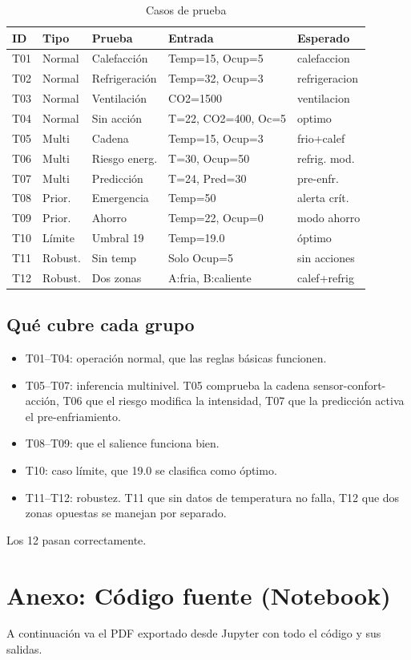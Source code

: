 \documentclass[12pt,a4paper]{article}
\begin{document}
\begin{table}[h]
\centering
\small
\begin{tabular}{lllp{3.8cm}l}
\toprule
\textbf{ID} & \textbf{Tipo} & \textbf{Prueba} & \textbf{Entrada} & \textbf{Esperado} \\
\midrule
T01 & Normal & Calefacci\'on & Temp=15, Ocup=5 & calefaccion \\
T02 & Normal & Refrigeraci\'on & Temp=32, Ocup=3 & refrigeracion \\
T03 & Normal & Ventilaci\'on & CO2=1500 & ventilacion \\
T04 & Normal & Sin acci\'on & T=22, CO2=400, Oc=5 & optimo \\
T05 & Multi & Cadena & Temp=15, Ocup=3 & frio+calef \\
T06 & Multi & Riesgo energ. & T=30, Ocup=50 & refrig. mod. \\
T07 & Multi & Predicci\'on & T=24, Pred=30 & pre-enfr. \\
T08 & Prior. & Emergencia & Temp=50 & alerta cr\'it. \\
T09 & Prior. & Ahorro & Temp=22, Ocup=0 & modo ahorro \\
T10 & L\'imite & Umbral 19 & Temp=19.0 & \'optimo \\
T11 & Robust. & Sin temp & Solo Ocup=5 & sin acciones \\
T12 & Robust. & Dos zonas & A:fria, B:caliente & calef+refrig \\
\bottomrule
\end{tabular}
\caption{Casos de prueba}
\end{table}

\subsection{Qu\'e cubre cada grupo}

\begin{itemize}
    \item T01--T04: operaci\'on normal, que las reglas b\'asicas funcionen.
    \item T05--T07: inferencia multinivel. T05 comprueba la cadena sensor-confort-acci\'on, T06 que el riesgo modifica la intensidad, T07 que la predicci\'on activa el pre-enfriamiento.
    \item T08--T09: que el salience funciona bien.
    \item T10: caso l\'imite, que 19.0 se clasifica como \'optimo.
    \item T11--T12: robustez. T11 que sin datos de temperatura no falla, T12 que dos zonas opuestas se manejan por separado.
\end{itemize}

Los 12 pasan correctamente.

\newpage
\section*{Anexo: C\'odigo fuente (Notebook)}

A continuaci\'on va el PDF exportado desde Jupyter con todo el c\'odigo y sus salidas.


\end{document}
